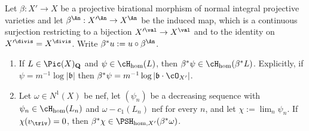 \begin{lemma}
\label{lem:ch38-pullback-stages}
Let $\beta:X'\to X$ be a projective birational morphism of normal
integral projective varieties and let $\beta^{\An}:X'^{\An}\to X^{\An}$
be the induced map, which is a continuous surjection restricting to a
bijection $X'^{\val}\to X^{\val}$ and to the identity on
$X'^{\divis}=X^{\divis}$.  Write $\beta^*u:=u\circ\beta^{\An}$.
\begin{enumerate}
\item\label{itm:ch38-pb:fs} If $L\in\Pic(X)_{\mathbf Q}$ and
 $\psi\in\cH_{\mathrm{hom}}(L)$, then
 $\beta^*\psi\in\cH_{\mathrm{hom}}(\beta^*L)$.  Explicitly, if
 $\psi=m^{-1}\log|\mathfrak b|$ then
 $\beta^*\psi=m^{-1}\log|\mathfrak b\cdot\cO_{X'}|$.
\item\label{itm:ch38-pb:limit} Let $\omega\in N^1(X)$ be nef, let
 $(\psi_n)$ be a decreasing sequence with
 $\psi_n\in\cH_{\mathrm{hom}}(L_n)$ and $\omega-c_1(L_n)$ nef for
 every $n$, and let $\chi:=\lim_n\psi_n$.  If
 $\chi(v_{\triv})=0$, then
 $\beta^*\chi\in\PSH_{\mathrm{hom},X'}(\beta^*\omega)$.
\end{enumerate}
\end{lemma}

